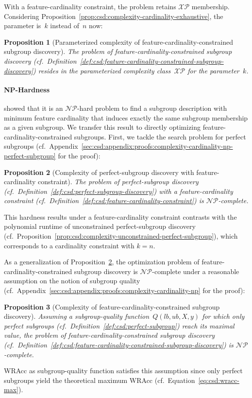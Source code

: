 \documentclass{article}
\newtheorem{proposition}{Proposition}
\theoremstyle{definition}
\begin{document}
With a feature-cardinality constraint, the problem retains $\mathcal{XP}$ membership.
Considering Proposition~\ref{prop:csd:complexity-cardinality-exhaustive}, the parameter is~$k$ instead of~$n$ now:
%
\begin{proposition}[Parameterized complexity of feature-cardinality-constrained subgroup discovery]
	The problem of feature-cardinality-constrained subgroup discovery (cf.~Definition~\ref{def:csd:feature-cardinality-constrained-subgroup-discovery}) resides in the parameterized complexity class~$\mathcal{XP}$ for the parameter~$k$.
	\label{prop:csd:complexity-cardinality-xp}
\end{proposition}

\paragraph{NP-Hardness}

\cite{boley2009non} showed that it is an $\mathcal{NP}$-hard problem to find a subgroup description with minimum feature cardinality that induces exactly the same subgroup membership as a given subgroup.
We transfer this result to directly optimizing feature-cardinality-constrained subgroups.
First, we tackle the search problem for perfect subgroups (cf.~Appendix~\ref{sec:csd:appendix:proofs:complexity-cardinality-np-perfect-subgroup} for the proof):
%
\begin{proposition}[Complexity of perfect-subgroup discovery with feature-cardinality constraint]
	 The problem of perfect-subgroup discovery (cf.~Definition~\ref{def:csd:perfect-subgroup-discovery}) with a feature-cardinality constraint (cf.~Definition~\ref{def:csd:feature-cardinality-constraint}) is $\mathcal{NP}$-complete.
	\label{prop:csd:complexity-cardinality-np-perfect-subgroup}
\end{proposition}
%
This hardness results under a feature-cardinality constraint contrasts with the polynomial runtime of unconstrained perfect-subgroup discovery (cf.~Proposition~\ref{prop:csd:complexity-unconstrained-perfect-subgroup}), which corresponds to a cardinality constraint with $k = n$.

As a generalization of Proposition~\ref{prop:csd:complexity-cardinality-np-perfect-subgroup}, the optimization problem of feature-cardinality-constrained subgroup discovery is $\mathcal{NP}$-complete under a reasonable assumption on the notion of subgroup quality (cf.~Appendix~\ref{sec:csd:appendix:proofs:complexity-cardinality-np} for the proof):
%
\begin{proposition}[Complexity of feature-cardinality-constrained subgroup discovery]
	Assuming a subgroup-quality function~$Q(\mathit{lb}, \mathit{ub}, X, y)$ for which only perfect subgroups (cf.~Definition~\ref{def:csd:perfect-subgroup}) reach its maximal value,
	the problem of feature-cardinality-constrained subgroup discovery (cf.~Definition~\ref{def:csd:feature-cardinality-constrained-subgroup-discovery}) is $\mathcal{NP}$-complete.
	\label{prop:csd:complexity-cardinality-np}
\end{proposition}
%
WRAcc as subgroup-quality function satisfies this assumption since only perfect subgroups yield the theoretical maximum WRAcc (cf.~Equation~\ref{eq:csd:wracc-max}).
\end{document}
